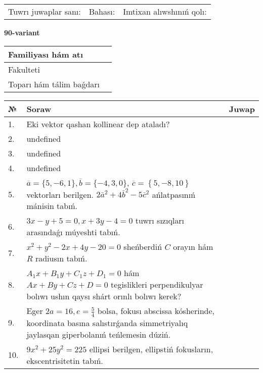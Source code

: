 \documentclass{article}
\begin{document}
\vspace{0.7cm}

\begin{tabular}{lll}
Tuwrı juwaplar sanı: \underline{\hspace{1cm}} & 
Bahası: \underline{\hspace{1cm}} & 
Imtixan alıwshınıń qolı: \underline{\hspace{2cm}} \\
\end{tabular}

\egroup

\newpage


\textbf{90-variant}\\

\bgroup
\def\arraystretch{1.6} %

\begin{tabular}{|m{5.7cm}|m{9.5cm}|}
\hline
Familiyası hám atı & \\
\hline
Fakulteti  & \\
\hline
Toparı hám tálim baǵdarı  & \\
\hline
\end{tabular}

\vspace{0.7cm}

\begin{tabular}{|m{0.7cm}|m{10cm}|m{4cm}|}
\hline
№ & Soraw & Juwap \\
\hline
1. & Eki vektor qashan kollinear dep ataladı? &  \\
\hline
2. & undefined &  \\
\hline
3. & undefined &  \\
\hline
4. & undefined &  \\
\hline
5. & \(\overline{a} = \{5,- 6, 1 \}, \overline{b} = \{ - 4, 3, 0 \} \), \(\overline{c} = \left\{ 5,- 8, 10 \right\}\) vektorları berilgen. \(2{\bar{a}}^{2} + 4{\bar{b}}^{2} - 5{\bar{c}}^{2}\) ańlatpasınıń mánisin tabıń. &  \\
\hline
6. & \(3 x - y + 5 = 0, x + 3 y - 4 = 0\) tuwrı sızıqları arasındaǵı múyeshti tabıń. &  \\
\hline
7. & \(x^{2} + y^{2} - 2 x + 4 y - 20 = 0\) sheńberdiń \(C\) orayın hám \(R\) radiusın tabıń. &  \\
\hline
8. & \(A_{1}x + B_{1}y + C_{1}z + D_{1} = 0\) hám \(Ax + By + Cz + D = 0\) tegislikleri perpendikulyar bolıwı ushın qaysı shárt orınlı bolıwı kerek? &  \\
\hline
9. & Eger \(2 a = 16, e = \frac{5}{4}\) bolsa, fokusı abscissa kósherinde, koordinata basına salıstırǵanda simmetriyalıq jaylasqan giperbolanıń teńlemesin dúziń. &  \\
\hline
10. & \(9 x^{2} + 25 y^{2} = 225\) ellipsi berilgen, ellipstiń fokusların, ekscentrisitetin tabıń. & \\
\hline
\end{tabular}
\end{document}
